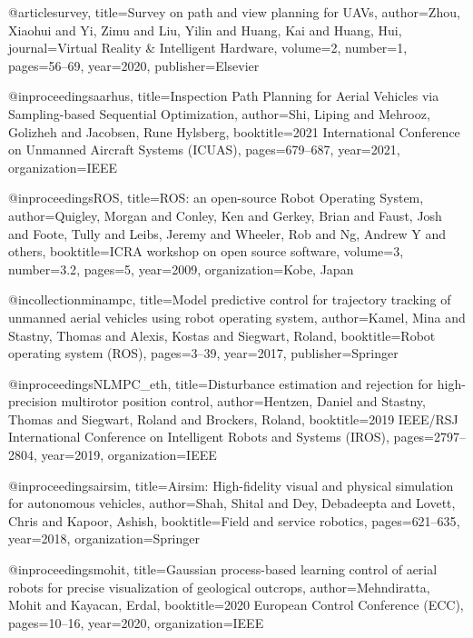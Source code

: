 \begin{thebibliography}{9}
@article{survey,
  title={Survey on path and view planning for UAVs},
  author={Zhou, Xiaohui and Yi, Zimu and Liu, Yilin and Huang, Kai and Huang, Hui},
  journal={Virtual Reality \& Intelligent Hardware},
  volume={2},
  number={1},
  pages={56--69},
  year={2020},
  publisher={Elsevier}
}

@inproceedings{aarhus,
  title={Inspection Path Planning for Aerial Vehicles via Sampling-based Sequential Optimization},
  author={Shi, Liping and Mehrooz, Golizheh and Jacobsen, Rune Hylsberg},
  booktitle={2021 International Conference on Unmanned Aircraft Systems (ICUAS)},
  pages={679--687},
  year={2021},
  organization={IEEE}
}



@inproceedings{ROS,
  title={ROS: an open-source Robot Operating System},
  author={Quigley, Morgan and Conley, Ken and Gerkey, Brian and Faust, Josh and Foote, Tully and Leibs, Jeremy and Wheeler, Rob and Ng, Andrew Y and others},
  booktitle={ICRA workshop on open source software},
  volume={3},
  number={3.2},
  pages={5},
  year={2009},
  organization={Kobe, Japan}
}


@incollection{minampc,
  title={Model predictive control for trajectory tracking of unmanned aerial vehicles using robot operating system},
  author={Kamel, Mina and Stastny, Thomas and Alexis, Kostas and Siegwart, Roland},
  booktitle={Robot operating system (ROS)},
  pages={3--39},
  year={2017},
  publisher={Springer}
}


@inproceedings{NLMPC_eth,
  title={Disturbance estimation and rejection for high-precision multirotor position control},
  author={Hentzen, Daniel and Stastny, Thomas and Siegwart, Roland and Brockers, Roland},
  booktitle={2019 IEEE/RSJ International Conference on Intelligent Robots and Systems (IROS)},
  pages={2797--2804},
  year={2019},
  organization={IEEE}
}

@inproceedings{airsim,
  title={Airsim: High-fidelity visual and physical simulation for autonomous vehicles},
  author={Shah, Shital and Dey, Debadeepta and Lovett, Chris and Kapoor, Ashish},
  booktitle={Field and service robotics},
  pages={621--635},
  year={2018},
  organization={Springer}
}

@inproceedings{mohit,
  title={Gaussian process-based learning control of aerial robots for precise visualization of geological outcrops},
  author={Mehndiratta, Mohit and Kayacan, Erdal},
  booktitle={2020 European Control Conference (ECC)},
  pages={10--16},
  year={2020},
  organization={IEEE}
}



\end{thebibliography}
